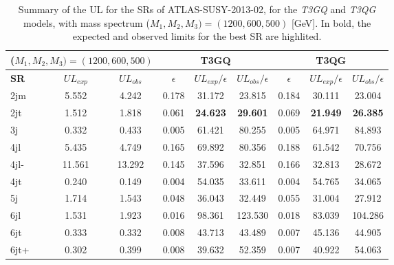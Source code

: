 \documentclass[a4paper,11pt]{article}
\begin{document}
\begin{table}[!b]
\centering
\renewcommand\arraystretch{1.3} 
\scriptsize
\begin{tabular}{ l c c    c c c  |  c c c  }
\toprule \toprule
\multicolumn{3}{c}{($M_1,M_2,M_3) = (1200,600,500)$} & \multicolumn{3}{c}{ \textbf{T3GQ}} & \multicolumn{3}{c}{ \textbf{T3QG}} \\  \toprule 
\textbf{SR} & $UL_{exp}$ & $UL_{obs}$ & $\epsilon$ &  $UL_{exp}/\epsilon$ & $UL_{obs}/\epsilon$ & $\epsilon$ & $UL_{exp}/ \epsilon$ & $UL_{obs}/ \epsilon$ \\
2jm & 5.552 &  4.242 &  0.178	 &31.172 &	23.815		 &0.184	 &30.111	 &23.004 \\
2jt  & 1.512  & 1.818 &  0.061& 	\textbf{24.623}	& \textbf{29.601}	& 	0.069	& \textbf{21.949}& 	\textbf{26.385} \\
3j &  0.332 &  0.433  & 0.005& 	61.421& 	80.255		& 0.005	& 64.971& 	84.893 \\ 
4jl  & 5.435 &  4.749  & 0.165	& 69.892	& 80.356	& 	0.188	& 61.542& 	70.756  \\
4jl-  & 11.561 &  13.292 &  0.145	& 37.596	& 32.851		& 0.166	& 32.813	& 28.672 \\
4jt  & 0.240  & 0.149  & 0.004& 	54.035	& 33.611		& 0.004	& 54.765& 	34.065  \\
5j  & 1.714  & 1.543  &0.048	& 36.043	& 32.449	& 	0.055	& 31.004	& 27.912  \\
6jl  & 1.531  & 1.923  & 0.016	& 98.361	& 123.530	& 	0.018	& 83.039	& 104.286 \\
6jt &  0.333  & 0.332 &  0.008	& 43.713& 	43.489	& 	0.007	& 45.136	& 44.905  \\
6jt+  & 0.302 &  0.399 & 0.008& 	39.632& 	52.359	& 	0.007	& 40.922	& 54.063 \\
\bottomrule \bottomrule
\end{tabular}
\caption{Summary of the UL for the SRs of ATLAS-SUSY-2013-02, for the \textit{T3GQ} and \textit{T3QG} models, with mass spectrum ($M_1,M_2,M_3) = (1200,600,500)$ [GeV]. In bold, the expected and observed limits for the best SR are highlited.}
\label{ATLAS02_UL_2}
\end{table}






\end{document}
